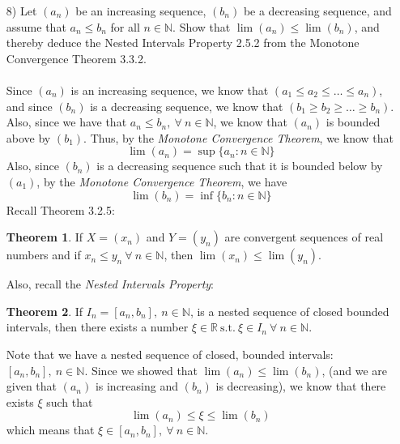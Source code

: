 \documentclass[12pt,letterpaper]{article}
\newcommand{\st}{\ \text{s.t.}\ }
\newcommand{\R}{\mathbb{R}}
\newcommand{\N}{\mathbb{N}}
\theoremstyle{case}
\theoremstyle{definition}
\newtheorem*{theorem*}{Theorem}
\begin{document}
\begin{enumerate}
\begin{enumerate}
\begin{enumerate}
			\item[8)] Let $(a_n)$ be an increasing sequence, $(b_n)$ be a decreasing sequence, and assume that $a_n \leq b_n$ for all $n \in \N$. Show that $\lim (a_n) \leq \lim (b_n)$, and thereby deduce the Nested Intervals Property 2.5.2 from the Monotone Convergence Theorem 3.3.2.
			\\\\Since $(a_n)$ is an increasing sequence, we know that $(a_1 \leq a_2 \leq \dots \leq a_n)$, and since $(b_n)$ is a decreasing sequence, we know that $(b_1 \geq b_2 \geq \dots \geq b_n)$. Also, since we have that $a_n \leq b_n,\ \forall\ n \in \N$, we know that $(a_n)$ is bounded above by $(b_1)$. Thus, by the \textit{Monotone Convergence Theorem}, we know that
			\[\lim (a_n) = \sup \{a_n: n \in \N\}\]
			Also, since $(b_n)$ is a decreasing sequence such that it is bounded below by $(a_1)$, by the \textit{Monotone Convergence Theorem}, we have
			\[\lim (b_n) = \inf \{b_n: n \in \N\}\]
			Recall Theorem 3.2.5:
			\begin{theorem*}
				If $X=(x_n)$ and $Y=(y_n)$ are convergent sequences of real numbers and if $x_n \leq y_n\ \forall\ n \in \N$, then $\lim (x_n) \leq \lim (y_n)$.
			\end{theorem*}
			Also, recall the \textit{Nested Intervals Property}:
			\begin{theorem*}
				If $I_n=[a_n,b_n],\ n \in \N$, is a nested sequence of closed bounded intervals, then there exists a number $\xi \in \R \st \xi \in I_n\ \forall\ n \in \N$.
			\end{theorem*}
			Note that we have a nested sequence of closed, bounded intervals: $[a_n, b_n],\ n \in \N$. Since we showed that $\lim (a_n) \leq \lim (b_n)$, (and we are given that $(a_n)$ is increasing and $(b_n)$ is decreasing), we know that there exists $\xi$ such that
			\[\lim (a_n) \leq \xi \leq \lim (b_n)\]
			which means that $\xi \in [a_n, b_n],\ \forall\ n \in \N$.
		\end{enumerate}
		

\end{enumerate}
\end{enumerate}
\end{document}
